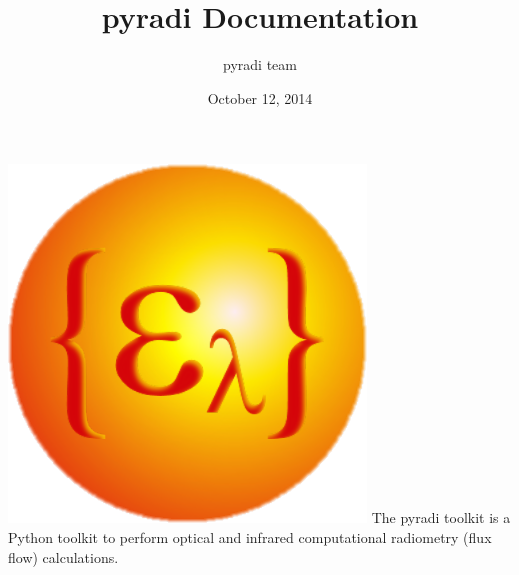 \documentclass[a4paper,10pt,english]{sphinxmanual}
\title{pyradi Documentation}
\date{October 12, 2014}
\author{pyradi team}
\begin{document}
\maketitle
\tableofcontents
{}\label{index::doc}


{\includegraphics{pyradi.png}\hfill}
\label{index:module-pyradi}
The pyradi toolkit is a Python toolkit to perform optical and infrared 
computational radiometry (flux flow) calculations.
\end{document}
